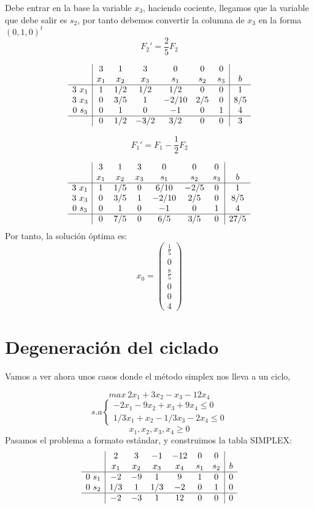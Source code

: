 \begin{ejemplo}
  Debe entrar en la base la variable $x_3$, haciendo cociente, llegamos que la variable que debe salir es $s_2$, por tanto debemos convertir la columna de $x_3$ en la forma $(0, 1, 0)^t$
  $$F_2'=\frac{2}{5}F_2$$

  $$
  \begin{array}{c|cccccc|c}
    & 3 & 1 & 3 & 0 & 0 & 0 &  \\
    & x_1 & x_2 & x_3 & s_1 & s_2 & s_3 & b \\ \hline
    3 ~ x_1 & 1 & 1/2 & 1/2 & 1/2 & 0 & 0 & 1 \\
    3 ~ x_3 & 0 & 3/5 & 1 & -2/10 & 2/5 & 0 & 8/5 \\
    0 ~ s_3 & 0 & 1 & 0 & -1 & 0 & 1 & 4 \\ \hline
    & 0 & 1/2 & -3/2 & 3/2 & 0 & 0 & 3
  \end{array}
  $$

  $$
  F_1'=F_1-\frac{1}{2}F_2$$$  $

  $$
  \begin{array}{c|cccccc|c}
    & 3 & 1 & 3 & 0 & 0 & 0 &  \\
    & x_1 & x_2 & x_3 & s_1 & s_2 & s_3 & b \\ \hline
    3 ~ x_1 & 1 & 1/5 & 0 & 6/10 & -2/5 & 0 & 1 \\
    3 ~ x_3 & 0 & 3/5 & 1 & -2/10 & 2/5 & 0 & 8/5 \\
    0 ~ s_3 & 0 & 1 & 0 & -1 & 0 & 1 & 4 \\ \hline
    & 0 &  7/5 & 0 & 6/5 & 3/5 & 0 & 27/5
  \end{array}
  $$
  Por tanto, la solución óptima es:
  $$ x_0=\left(
    \begin{array}{c}
      \displaystyle \frac{1}{5} \\
      0 \\
      \displaystyle \frac{8}{5} \\
      0 \\
      0 \\
      4
    \end{array}
  \right)
  $$
\end{ejemplo}
\section{Degeneración del ciclado}
Vamos a ver ahora unos casos donde el método simplex nos lleva a un
ciclo,

$$ max ~2x_1+3x_2-x_3-12x_4$$
$$s.a \left\{
  \begin{array}{c}
    -2x_1-9x_2+x_3+9x_4 \leq 0 \\
    1/3x_1+x_2-1/3x_3-2x_4 \leq 0
  \end{array}
\right.
$$
$$x_1, x_2, x_3, x_4 \geq 0$$
Pasamos el problema a formato estándar, y construimos la tabla SIMPLEX:
$$
\begin{array}{c|cccccc|c}
  & 2 & 3 & -1 & -12 & 0 & 0 & \\
  & x_1 & x_2 & x_3 & x_4 & s_1 & s_2 & b \\ \hline
  0 ~ s_1 & -2 & -9 & 1 & 9 & 1 & 0 & 0 \\
  0 ~ s_2 & 1/3 & 1 & 1/3 & -2 & 0 & 1 & 0 \\ \hline
  & -2 & -3 & 1 & 12 & 0 & 0 & 0
\end{array}
$$


